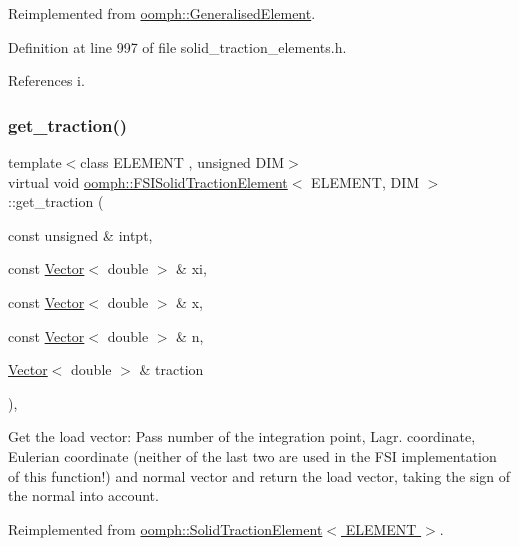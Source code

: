 Reimplemented from \hyperlink{classoomph_1_1GeneralisedElement_a069f59bfc3e607a5bebba52c6314d777}{oomph\+::\+Generalised\+Element}.



Definition at line 997 of file solid\+\_\+traction\+\_\+elements.\+h.



References i.

\mbox{\label{classoomph_1_1FSISolidTractionElement_a861d9e1c8358c02f304e90c0d16a050d}} 
\subsubsection{\texorpdfstring{get\+\_\+traction()}{get\_traction()}}
{\footnotesize\ttfamily template$<$class E\+L\+E\+M\+E\+NT , unsigned D\+IM$>$ \\
virtual void \hyperlink{classoomph_1_1FSISolidTractionElement}{oomph\+::\+F\+S\+I\+Solid\+Traction\+Element}$<$ E\+L\+E\+M\+E\+NT, D\+IM $>$\+::get\+\_\+traction (\begin{DoxyParamCaption}\item[{const unsigned \&}]{intpt,  }\item[{const \hyperlink{classoomph_1_1Vector}{Vector}$<$ double $>$ \&}]{xi,  }\item[{const \hyperlink{classoomph_1_1Vector}{Vector}$<$ double $>$ \&}]{x,  }\item[{const \hyperlink{classoomph_1_1Vector}{Vector}$<$ double $>$ \&}]{n,  }\item[{\hyperlink{classoomph_1_1Vector}{Vector}$<$ double $>$ \&}]{traction }\end{DoxyParamCaption})\hspace{0.3cm}{\ttfamily [inline]}, {\ttfamily [virtual]}}



Get the load vector\+: Pass number of the integration point, Lagr. coordinate, Eulerian coordinate (neither of the last two are used in the F\+SI implementation of this function!) and normal vector and return the load vector, taking the sign of the normal into account. 



Reimplemented from \hyperlink{classoomph_1_1SolidTractionElement_ace61448de38dc67cbc0f7b42ed743eff}{oomph\+::\+Solid\+Traction\+Element$<$ E\+L\+E\+M\+E\+N\+T $>$}.



